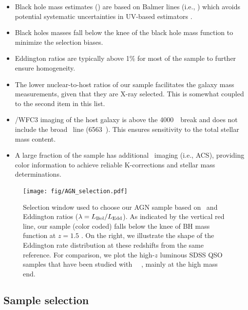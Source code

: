 \documentclass[apj]{emulateapj}
\begin{document}
\begin{itemize}

\item Black hole mass estimates (\mbh) are based on Balmer lines (i.e., \halpha) which avoids potential systematic uncertainties in UV-based estimators \citep{Greene2005}.

\item Black holes masses fall below the knee of the black hole mass function to minimize the selection biases.

\item Eddington ratios are typically above 1\% for most of the sample to further ensure homogeneity.

\item The lower nuclear-to-host ratios of our sample facilitates the galaxy mass measurements, given that they are 
X-ray selected. This is somewhat coupled to the second item in this list.

\item \hst/WFC3 imaging of the host galaxy is above the 4000~\angstrom\ break and does not include the broad \halpha\ line (6563~\angstrom). This ensures sensitivity to the total stellar mass content.

\item A large fraction of the sample has additional \hst\ imaging (i.e., ACS), providing color information to achieve reliable K-corrections and stellar mass determinations. 
\end{itemize}

\begin{figure}
\centering
{
\texttt{[image: fig/AGN\_selection.pdf]}
}
\caption{\label{fig:selection} Selection window used to choose our AGN sample based on  \mbh~and Eddington ratios ($\lambda = L_{\rm Bol}/L_{\rm Edd}$). As indicated by the vertical red line, our sample (color coded) falls below the knee of BH mass function at $z=1.5$ \citep[top panel,][]{Schulze2015}. On the right, we illustrate the shape of the Eddington rate distribution at these redshifts from the same reference. For comparison, we plot the high-$z$ luminous SDSS QSO samples that have been studied with \hst\ ~\citep[grey squares and circles from][respectively]{Peng2006a, Decarli2010}, mainly at the high mass end.}
\end{figure} 

\subsection{Sample selection}\label{sec:target_selection}
\end{document}
